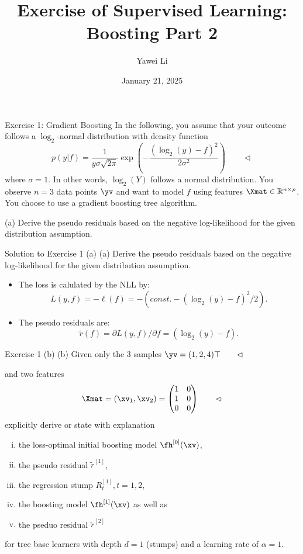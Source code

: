 \documentclass[aspectratio=169]{beamer}
\title[]{\textbf{Exercise of Supervised Learning: \\ Boosting Part 2}}
\author{Yawei Li}
\institute[LMU]
{
\\
  \texttt{yawei.li@stat.uni-muenchen.de}
}
\date{January 21, 2025}
\newcommand{\fhx}[1]{\fh^{[#1]}(\xv)}
\newcommand{\rtilde}[1]{\tilde{r}^{[#1]}}
\newcommand{\Rt}[1]{R_t^{[#1]}}
\begin{document}
\begin{frame}
\titlepage
\end{frame}

\begin{frame}{Exercise 1: Gradient Boosting}
	In the following, you assume that your outcome follows a $\log_2$-normal distribution with density function 
	$$p(y|f) = \frac{1}{y \sigma \sqrt{2\pi}} \exp\left( - \frac{(\log_2(y) - f)^2}{2\sigma^2} \right) \qquad \lhd$$ 
	where $\sigma = 1$. In other words, $\log_2(Y)$ follows a normal distribution. You observe $n = 3$ data points $\yv$ and want to model $f$ using features $\Xmat \in \mathbb{R}^{n \times p}$. You choose to use a gradient boosting tree algorithm. 
	
	(a) Derive the pseudo residuals based on the negative log-likelihood for the given distribution assumption.
\end{frame}

\begin{frame}{Solution to Exercise 1 (a)}
	(a) Derive the pseudo residuals based on the negative log-likelihood for the given distribution assumption.
	\begin{itemize}
		\item<2-> The loss is calulated by the NLL by: $$L(y, f) = - \ell(f) = - (const. - (\log_2(y) - f)^2 /2).$$
		\item<3-> The pseudo residuals are: $$\tilde{r} (f) = \partial L(y,f) / \partial f = (\log_2(y) - f).$$
	\end{itemize}
\end{frame}

\begin{frame}{Exercise 1 (b)}
	(b) Given only the 3 samples $\yv = (1, 2, 4)\top \qquad \lhd$ 
	
	and two features 
	$$\Xmat = (\xv_1, \xv_2) = 
		\begin{pmatrix}
			1 & 0 \\
			1 & 0 \\
			0 & 0 \\
		\end{pmatrix} \qquad \lhd
	$$
	explicitly derive or state with explanation
	\begin{enumerate}[(i)]
		\item the loss-optimal initial boosting model $\fhx{0}$,
		\item the pseudo residual $\rtilde{1}$,
		\item the regression stump $\Rt{1}, t = 1, 2$,
		\item the boosting model $\fhx{1}$ as well as 
		\item the pseduo residual $\rtilde{2}$
	\end{enumerate}
	for tree base learners with depth $d = 1$ (stumps) and a learning rate of $\alpha = 1$. 
\end{frame}
\end{document}
